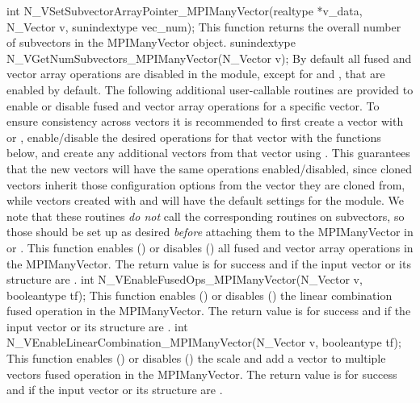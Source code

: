 {
  int N\_VSetSubvectorArrayPointer\_MPIManyVector(realtype *v\_data, N\_Vector v, sunindextype vec\_num);
}
{
  This function returns the overall number of subvectors in the
  MPIManyVector object.
}
{
  sunindextype N\_VGetNumSubvectors\_MPIManyVector(N\_Vector v);
}
By default all fused and vector array operations are disabled in the {\nvecmpimanyvector}
module, except for  and
, that are enabled by default. The
following additional user-callable routines are provided to enable or
disable fused and vector array operations for a specific vector. To
ensure consistency across vectors it is recommended to first create a
vector with  or ,
enable/disable the desired operations for that vector with the
functions below, and create any additional vectors from that vector
using . This guarantees that the new vectors will have
the same operations enabled/disabled, since cloned vectors inherit
those configuration options from the vector they are cloned from, while
vectors created with  and
 will have the default settings for the
{\nvecmpimanyvector} module.  We note that these routines \emph{do not}
call the corresponding routines on subvectors, so those should be set up
as desired \emph{before} attaching them to the MPIManyVector in
 or .
{
  This function enables () or disables () all fused and
  vector array operations in the MPIManyVector. The return value is  for
  success and  if the input vector or its  structure are .
}
{
  int N\_VEnableFusedOps\_MPIManyVector(N\_Vector v, booleantype tf);
}
{
  This function enables () or disables () the linear
  combination fused operation in the MPIManyVector. The return value is  for
  success and  if the input vector or its  structure are .
}
{
  int N\_VEnableLinearCombination\_MPIManyVector(N\_Vector v, booleantype tf);
}
{
  This function enables () or disables () the scale and
  add a vector to multiple vectors fused operation in the MPIManyVector. The
  return value is  for success and  if the input vector or its
   structure are .
}
